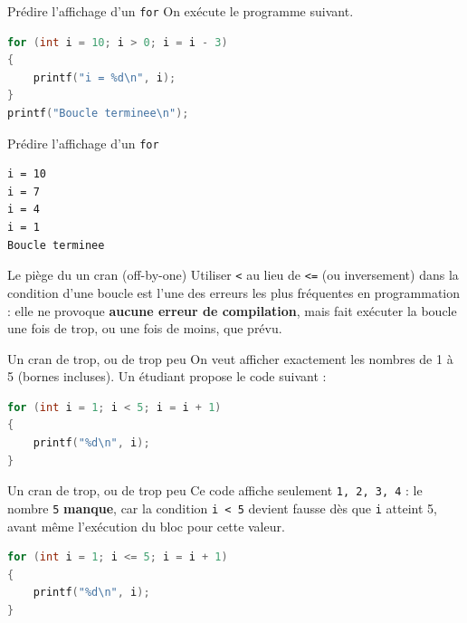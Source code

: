 \begin{UPSTIexercice}{Prédire l'affichage d'un \texttt{for}}
    On exécute le programme suivant.
    \begin{lstlisting}[language=C]
for (int i = 10; i > 0; i = i - 3)
{
    printf("i = %d\n", i);
}
printf("Boucle terminee\n");
\end{lstlisting}
\end{UPSTIexercice}

\begin{UPSTIprofOnlyEnv}
    \begin{UPSTIcorrectionP}{Prédire l'affichage d'un \texttt{for}}
        \begin{lstlisting}[language=bash,style=console]
i = 10
i = 7
i = 4
i = 1
Boucle terminee
\end{lstlisting}
    \end{UPSTIcorrectionP}
\end{UPSTIprofOnlyEnv}


\begin{UPSTIwarning}{Le piège du \og un cran \fg{} (off-by-one)}
    Utiliser \texttt{<} au lieu de \texttt{<=} (ou inversement) dans la condition d'une boucle est l'une des erreurs les plus fréquentes en programmation : elle ne provoque \textbf{aucune erreur de compilation}, mais fait exécuter la boucle une fois de trop, ou une fois de moins, que prévu.
\end{UPSTIwarning}

\begin{UPSTIexercice}{Un cran de trop, ou de trop peu}
    On veut afficher exactement les nombres de 1 à 5 (bornes incluses). Un étudiant propose le code suivant :
    \begin{lstlisting}[language=C]
for (int i = 1; i < 5; i = i + 1)
{
    printf("%d\n", i);
}
\end{lstlisting}
\end{UPSTIexercice}

\begin{UPSTIprofOnlyEnv}
    \begin{UPSTIcorrectionP}{Un cran de trop, ou de trop peu}
        Ce code affiche seulement \texttt{1, 2, 3, 4} : le nombre \texttt{5} \textbf{manque}, car la condition \texttt{i < 5} devient fausse dès que \texttt{i} atteint 5, avant même l'exécution du bloc pour cette valeur.
        \begin{lstlisting}[language=C]
for (int i = 1; i <= 5; i = i + 1)
{
    printf("%d\n", i);
}
\end{lstlisting}
    \end{UPSTIcorrectionP}
\end{UPSTIprofOnlyEnv}


